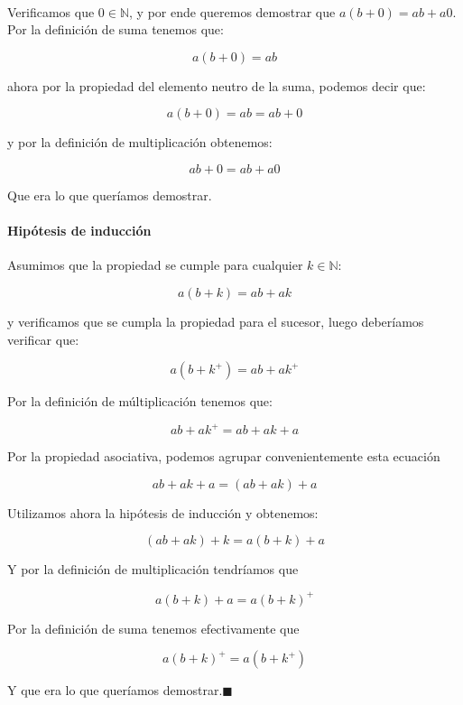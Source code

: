 \documentclass{article}
\begin{document}
\paragraph{} Verificamos que $0 \in \mathbb{N}$, y por ende queremos demostrar que $a(b + 0) = ab + a0$. Por la definición de suma tenemos que:

	$$a(b + 0) = ab$$

ahora por la propiedad del elemento neutro de la suma, podemos decir que:

$$a(b + 0) = ab = ab + 0 $$

y por la definición de multiplicación obtenemos:

$$ab + 0 = ab + a0$$

Que era lo que queríamos demostrar.

\paragraph{Hipótesis de inducción} Asumimos que la propiedad se cumple para cualquier $k \in \mathbb{N}$:

$$a(b + k) = ab + ak$$

y verificamos que se cumpla la propiedad para el sucesor, luego deberíamos verificar que:

$$a(b + k^+) = ab + ak^+$$

Por la definición de múltiplicación tenemos que:

$$ab + ak^+ = ab + ak + a$$

Por la propiedad asociativa, podemos agrupar convenientemente esta ecuación

$$ab + ak + a = (ab + ak) + a$$

Utilizamos ahora la hipótesis de inducción y obtenemos:

$$(ab + ak) + k = a(b + k) + a$$

Y por la definición de multiplicación tendríamos que 

$$a(b + k) + a = a(b + k)^+$$

Por la definición de suma tenemos efectivamente que 

$$a(b + k)^+ = a(b + k^+)$$

Y que era lo que queríamos demostrar.$\blacksquare$
\end{document}
